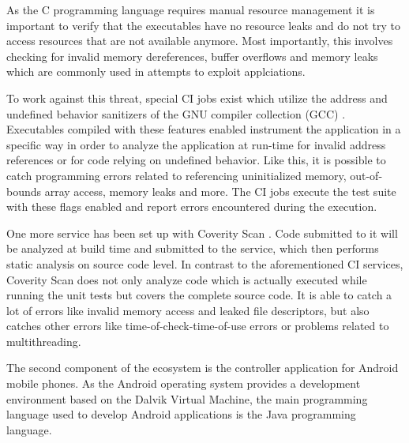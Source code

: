 As the C programming language requires manual resource management it is important to verify that the executables have no resource leaks and do not try to access resources that are not available anymore.
Most importantly, this involves checking for invalid memory dereferences, buffer overflows and memory leaks which are commonly used in attempts to exploit applciations.

To work against this threat, special CI jobs exist which utilize the address and undefined behavior sanitizers of the GNU compiler collection (GCC) \cite{gcc}.
Executables compiled with these features enabled instrument the application in a specific way in order to analyze the application at run-time for invalid address references or for code relying on undefined behavior.
Like this, it is possible to catch programming errors related to referencing uninitialized memory, out-of-bounds array access, memory leaks and more.
The CI jobs execute the test suite with these flags enabled and report errors encountered during the execution.

One more service has been set up with Coverity Scan \cite{coverity}.
Code submitted to it will be analyzed at build time and submitted to the service, which then performs static analysis on source code level.
In contrast to the aforementioned CI services, Coverity Scan does not only analyze code which is actually executed while running the unit tests but covers the complete source code.
It is able to catch a lot of errors like invalid memory access and leaked file descriptors, but also catches other errors like time-of-check-time-of-use errors or problems related to multithreading.

\bigskip

The second component of the ecosystem is the controller application for Android mobile phones.
As the Android operating system provides a development environment based on the Dalvik Virtual Machine, the main programming language used to develop Android applications is the Java programming language.

